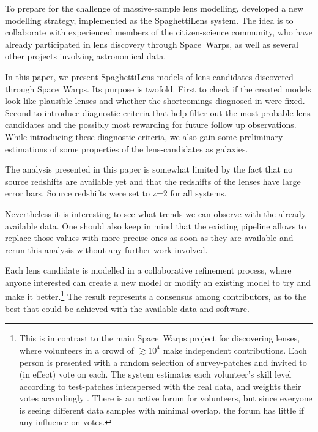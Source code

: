 To prepare for the challenge of massive-sample lens modelling,
\cite{2015MNRAS.447.2170K} developed a new modelling strategy,
implemented as the SpaghettiLens system.  The idea is to collaborate
with experienced members of the citizen-science community, who have
already participated in lens discovery through Space~Warps, as well as
several other projects involving astronomical data.

In this paper, we present SpaghettiLens models of lens-candidates discovered through Space~Warps.
Its purpose is twofold.
First to check if the created models look like plausible lenses and whether the shortcomings diagnosed in \cite{2015MNRAS.447.2170K} were fixed.
Second to introduce diagnostic criteria that help filter out the most probable lens candidates and the possibly most rewarding for future follow up observations.
While introducing these diagnostic criteria, we also gain some preliminary estimations of some properties of the lens-candidates as galaxies.


The analysis presented in this paper is somewhat limited by the fact that no source redshifts are available yet and that the redshifts of the lenses have large error bars.
Source redshifts were set to z=2 for all systems. %

Nevertheless it is interesting to see what trends we can observe with the already available data.
One should also keep in mind that the existing pipeline allows to replace those values with more precise ones as soon as they are available and rerun this analysis without any further work involved.


Each lens candidate is modelled in a collaborative refinement
process, where anyone interested can create a new model or modify an
existing model to try and make it better.\footnote{This is in contrast
  to the main Space~Warps project for discovering lenses, where
  volunteers in a crowd of $\gtrsim10^4$ make independent
  contributions.  Each person is presented with a random selection of
  survey-patches and invited to (in effect) vote on each.  The system
  estimates each volunteer's skill level according to test-patches
  interspersed with the real data, and weights their votes accordingly
  \citep{2016MNRAS.455.1171M}.  There is an active forum for
  volunteers, but since everyone is seeing different data samples with
  minimal overlap, the forum has little if any influence on votes.}
The result represents a consensus among contributors, as to the best
that could be achieved with the available data and software.

